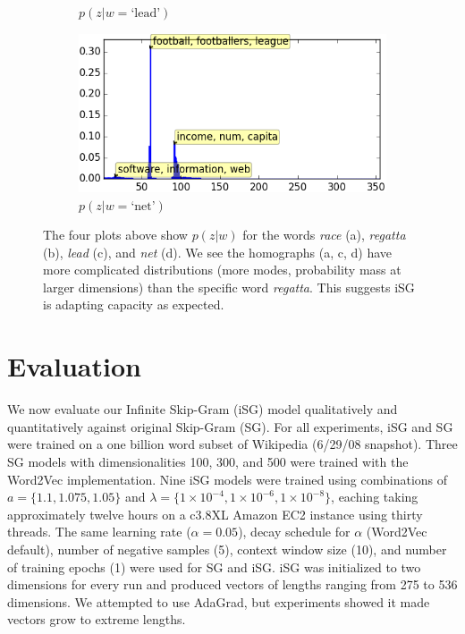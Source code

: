 \documentclass{article} %
\begin{document}
\begin{figure}
\begin{subfigure}{.49\textwidth}
  \caption{$p(z|w=\text{`lead'})$}
  \label{fig:sub3p}
\end{subfigure}
\begin{subfigure}{.49\textwidth}
  \centering
  \includegraphics[width=.99\linewidth]{p_z_w_for_net.png}
  \caption{$p(z|w=\text{`net'})$}
  \label{fig:sub4p}
\end{subfigure}
\caption{The four plots above show $p(z|w)$ for the words \textit{race} (a), \textit{regatta} (b), \textit{lead} (c), and \textit{net} (d).  We see the homographs (a, c, d) have more complicated distributions (more modes, probability mass at larger dimensions) than the specific word \textit{regatta}.  This suggests iSG is adapting capacity as expected.}
\label{p_z_plots}
\end{figure}
\section{Evaluation}\label{eval}
We now evaluate our Infinite Skip-Gram (iSG) model qualitatively and quantitatively against original Skip-Gram (SG).  For all experiments, iSG and SG were trained on a one billion word subset of Wikipedia (6/29/08 snapshot).  Three SG models with dimensionalities 100, 300, and 500 were trained with the Word2Vec implementation.  Nine iSG models were trained using combinations of $a = \{1.1, 1.075, 1.05 \}$ and $\lambda = \{ 1\times 10^{-4}, 1\times 10^{-6}, 1\times 10^{-8} \}$, eaching taking approximately twelve hours on a c3.8XL Amazon EC2 instance using thirty threads.  The same learning rate ($\alpha = 0.05$), decay schedule for $\alpha$ (Word2Vec default), number of negative samples (5), context window size (10), and number of training epochs (1) were used for SG and iSG.  iSG was initialized to two dimensions for every run and produced vectors of lengths ranging from 275 to 536 dimensions.  We attempted to use AdaGrad, but experiments showed it made vectors grow to extreme lengths. 
\end{document}
